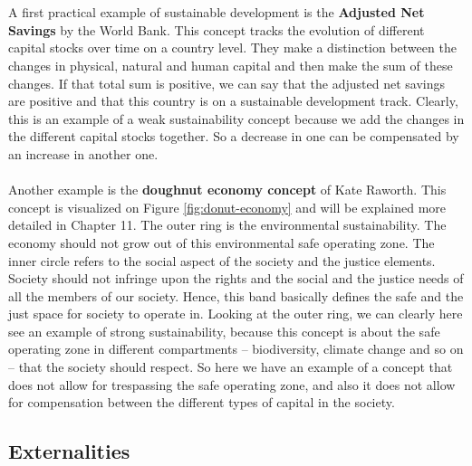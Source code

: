 \documentclass[../summary.tex]{subfiles}
\begin{document}
	 \\\\
	 A first practical example of sustainable development is the \textbf{Adjusted Net Savings} by the World Bank. This concept tracks the evolution of different capital stocks over time on a country level. They make a distinction between the changes in physical, natural and human capital and then make the sum of these changes. If that total sum is positive, we can say that the adjusted net savings are positive and that this country is on a sustainable development track. Clearly, this is an example of a weak sustainability concept because we add the changes in the different capital stocks together. So a decrease in one can be compensated by an increase in another one.
	 \\\\
	 Another example is the \textbf{doughnut economy concept} of Kate Raworth. This concept is visualized on Figure \ref{fig:donut-economy} and will be explained more detailed in Chapter 11. The outer ring is the environmental sustainability. The economy should not grow out of this environmental safe operating zone. The inner circle refers to the social aspect of the society and the justice elements. Society should not infringe upon the rights and the social and the justice needs of all the members of our society. Hence, this band basically defines the safe and the just space for society to operate in. Looking at the outer ring, we can clearly here see an example of strong sustainability, because this concept is about the safe operating zone in different compartments -- biodiversity, climate change and so on -- that the society should respect. So here we have an example of a concept that does not allow for trespassing the safe operating zone, and also it does not allow for compensation between the different types of capital in the society. 
	 
	 \newpage
	 \subsection{Externalities}
	 
\end{document}
